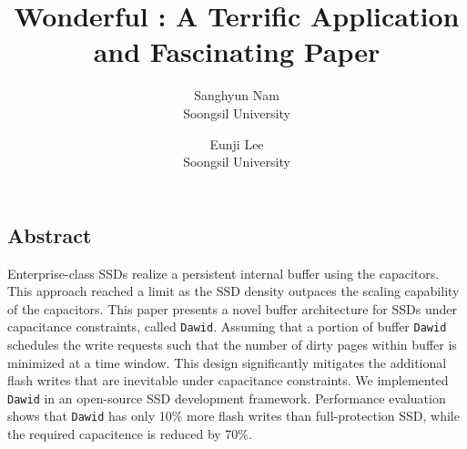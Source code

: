 \documentclass[letterpaper,twocolumn,10pt]{article}
\newcommand{\ours}{\texttt{Dawid}}
\begin{document}
\date{}

\title{\Large \bf Wonderful : A Terrific Application and Fascinating Paper}

\author{
{\rm Sanghyun Nam}\\
Soongsil University
\and
{\rm Eunji Lee}\\
Soongsil University
}

\maketitle

\thispagestyle{empty}


\subsection*{Abstract}
Enterprise-class SSDs realize a persistent internal buffer using the capacitors. 
This approach reached a limit as the SSD density outpaces the scaling capability of the capacitors. 
This paper presents a novel buffer architecture for SSDs under capacitance constraints, called \ours{}.
Assuming that a portion of buffer 
\ours{} schedules the write requests such that the number of dirty pages within buffer
is minimized at a time window. This design significantly mitigates the additional flash writes 
that are inevitable under capacitance constraints. We implemented \ours{} in an open-source SSD development 
framework. Performance evaluation shows that \ours{} has only 10\% more flash writes 
than full-protection SSD, while the required capacitence is reduced by 70\%.






%
%
%
%
\end{document}
